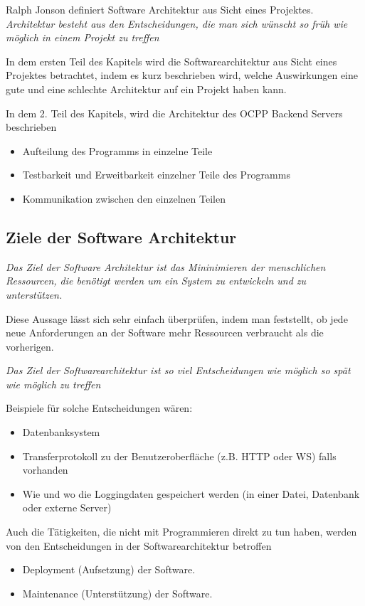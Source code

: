 \documentclass{article}
\begin{document}
    Ralph Jonson definiert Software Architektur aus Sicht eines Projektes.\\
    \textit{Architektur besteht aus den Entscheidungen, die man sich wünscht so früh wie möglich in einem Projekt zu treffen}
    \cite{MF_WhatIsSA}

    In dem ersten Teil des Kapitels wird die Softwarearchitektur aus Sicht eines Projektes betrachtet, 
    indem es kurz beschrieben wird, welche Auswirkungen eine gute und eine schlechte Architektur auf ein Projekt haben kann.

    In dem 2. Teil des Kapitels, wird die Architektur des OCPP Backend Servers beschrieben
    \begin{itemize}
        \item Aufteilung des Programms in einzelne Teile
        \item Testbarkeit und Erweitbarkeit einzelner Teile des Programms
        \item Kommunikation zwischen den einzelnen Teilen
    \end{itemize}

    \subsection{Ziele der Software Architektur}

    \textit{Das Ziel der Software Architektur ist das Mininimieren der menschlichen Ressourcen, 
    die benötigt werden um ein System zu entwickeln und zu unterstützen.}\cite[5]{cleanArchitecture}

    Diese Aussage lässt sich sehr einfach überprüfen, indem man feststellt, 
    ob jede neue Anforderungen an der Software mehr Ressourcen verbraucht als die vorherigen.

    \textit{Das Ziel der Softwarearchitektur ist so viel Entscheidungen wie möglich so spät wie möglich zu treffen}
    \cite[136]{cleanArchitecture}

    Beispiele für solche Entscheidungen wären:
    \begin{itemize}
        \item Datenbanksystem
        \item Transferprotokoll zu der Benutzeroberfläche (z.B. HTTP oder WS) falls vorhanden
        \item Wie und wo die Loggingdaten gespeichert werden (in einer Datei, Datenbank oder externe Server)
    \end{itemize}

    Auch die Tätigkeiten, die nicht mit Programmieren direkt zu tun haben, werden von den Entscheidungen in der Softwarearchitektur betroffen
    \begin{itemize}
        \item Deployment (Aufsetzung) der Software.
        \item Maintenance (Unterstützung) der Software.
    \end{itemize}
\end{document}
